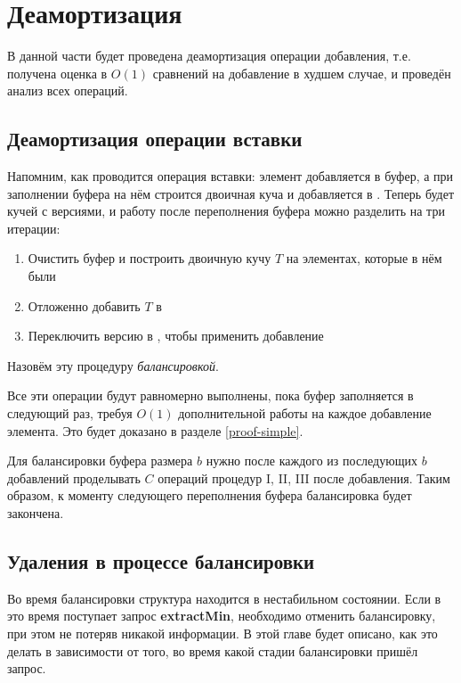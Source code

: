 \section{Деамортизация} \label{deamort-simple}
В данной части будет проведена деамортизация операции добавления, т.е. получена
оценка в $O(1)$ сравнений на добавление в худшем случае, и проведён анализ всех
операций.



\subsection{Деамортизация операции вставки}

Напомним, как проводится операция вставки: элемент добавляется в буфер,
а при заполнении буфера на нём строится двоичная куча и добавляется в
\MH. Теперь \MH будет кучей с версиями, и работу после переполнения буфера
можно разделить на три итерации:
\begin{enumerate}[label=\Roman*.]
\item Очистить буфер и построить двоичную кучу $T$ на элементах, которые в нём были
\item Отложенно добавить $T$ в \MH
\item Переключить версию в \MH, чтобы применить добавление
\end{enumerate}
Назовём эту процедуру \emph{балансировкой}.

Все эти операции будут равномерно выполнены, пока буфер заполняется в следующий
раз, требуя $O(1)$ дополнительной работы на каждое добавление элемента.
Это будет доказано в разделе \ref{proof-simple}.

Для балансировки буфера размера $b$ нужно после каждого из последующих $b$
добавлений проделывать $C$ операций процедур I, II, III после добавления.
Таким образом, к моменту следующего переполнения буфера балансировка будет закончена.

\subsection{Удаления в процессе балансировки}

Во время балансировки структура находится в нестабильном состоянии. Если
в это время поступает запрос \textbf{extractMin}, необходимо отменить балансировку,
при этом не потеряв никакой информации. В этой главе будет описано, как это делать
в зависимости от того, во время какой стадии балансировки пришёл запрос.

